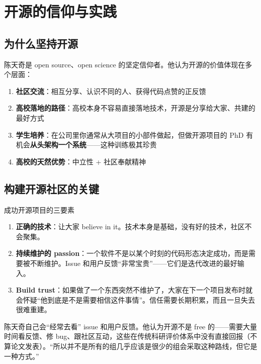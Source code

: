 \documentclass[a4paper]{article}
\begin{document}
\section{开源的信仰与实践}

\subsection{为什么坚持开源}

陈天奇是 open source、open science 的坚定信仰者。他认为开源的价值体现在多个层面：

\begin{enumerate}
    \item \textbf{社区交流}：相互分享、认识不同的人、获得代码点赞的正反馈
    \item \textbf{高校落地的路径}：高校本身不容易直接落地技术，开源是分享给大家、共建的最好方式
    \item \textbf{学生培养}：在公司里你通常从大项目的小部件做起，但做开源项目的 PhD 有机会\textbf{从头架构一个系统}------这种训练极其珍贵
    \item \textbf{高校的天然优势}：中立性 + 社区奉献精神
\end{enumerate}

\subsection{构建开源社区的关键}

\begin{importantbox}{成功开源项目的三要素}
\begin{enumerate}
    \item \textbf{正确的技术}：让大家 believe in it。技术本身是基础，没有好的技术，社区不会聚集。
    \item \textbf{持续维护的 passion}：一个软件不是以某个时刻的代码形态决定成功，而是需要被不断维护。Issue 和用户反馈``非常宝贵''------它们是迭代改进的最好输入。
    \item \textbf{Build trust}：如果做了一个东西突然不维护了，大家在下一个项目发布时就会怀疑``他到底是不是需要相信这件事情''。信任需要长期积累，而且一旦失去很难重建。
\end{enumerate}
\end{importantbox}

陈天奇自己会``经常去看'' issue 和用户反馈。他认为开源不是 free 的------需要大量时间看反馈、修 bug、跟社区互动，这些在传统科研评价体系中没有直接回报（不算论文发表）。``所以并不是所有的组几乎应该是很少的组会采取这种路线，但它是一种方式。''
\end{document}
